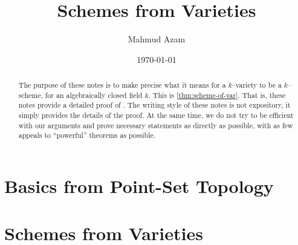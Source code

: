 \documentclass{article}
\title{Schemes from Varieties}
\author{Mahmud Azam}
\date{\today}
\begin{document}
\maketitle

\begin{abstract}
The purpose of these notes is to make precise what it means
for a $k$--variety to be a $k$--scheme, for an algebraically closed
field $k$. This is \cref{thm:scheme-of-var}. That is,
these notes provide a detailed proof of \cite[Proposition 2.6]{HartAG}.
The writing style of these notes is not expository, it simply provides
the details of the proof. At the same time, we do not try to be efficient
with our arguments and prove necessary statements as directly as possible,
with as few appeals to ``powerful'' theorems as possible.
\end{abstract}

\tableofcontents

\section{Basics from Point-Set Topology}







\section{Schemes from Varieties}





\printbibliography
\end{document}
